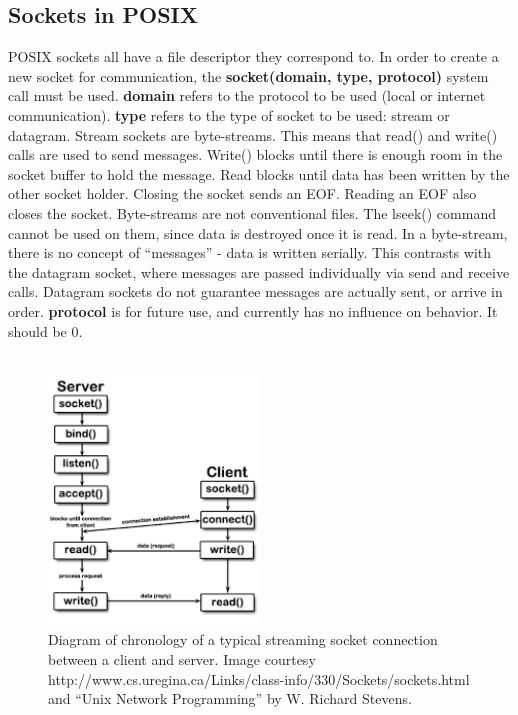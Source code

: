 \documentclass[11pt]{article}
\begin{document}
\subsection{Sockets in POSIX}
POSIX sockets all have a file descriptor they correspond to. In order to create a new socket for communication, the \textbf{socket(domain, type, protocol)} system call must be used. \textbf{domain} refers to the protocol to be used (local or internet communication). \textbf{type} refers to the type of socket to be used: stream or datagram. Stream sockets are byte-streams. This means that read() and write() calls are used to send messages. Write() blocks until there is enough room in the socket buffer to hold the message. Read blocks until data has been written by the other socket holder. Closing the socket sends an EOF. Reading an EOF also closes the socket. Byte-streams are not conventional files. The lseek() command cannot be used on them, since data is destroyed once it is read. In a byte-stream, there is no concept of ``messages'' - data is written serially. This contrasts with the datagram socket, where messages are passed individually via send and receive calls. Datagram sockets do not guarantee messages are actually sent, or arrive in order. \textbf{protocol} is for future use, and currently has no influence on behavior. It should be 0.\\ \\

\begin{figure}[h!]
\centering
\includegraphics[width=0.5\textwidth]{socket-chronology.png}
\caption{Diagram of chronology of a typical streaming socket connection between a client and server. Image courtesy http://www.cs.uregina.ca/Links/class-info/330/Sockets/sockets.html and ``Unix Network Programming'' by W. Richard Stevens.}
\label{fig:socket-chronology}
\end{figure}
\end{document}
